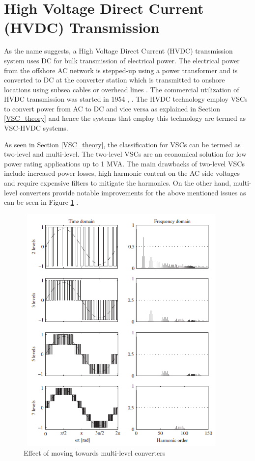 \section{High Voltage Direct Current (HVDC) Transmission}\label{HVDC_trans_theory}
As the name suggests, a High Voltage Direct Current (\gls{HVDC}) transmission system uses \gls{DC} for bulk transmission of electrical power. The electrical power from the offshore \gls{AC} network is stepped-up using a power transformer and is converted to \gls{DC} at the converter station which is transmitted to onshore locations using subsea cables or overhead lines \cite{abbreviewnew}. The commercial utilization of \gls{HVDC} transmission was started in 1954 \cite{cigre2005b4}, \cite{peake_history_2010}. The \gls{HVDC} technology employ \gls{VSC}s to convert power from \gls{AC} to \gls{DC} and vice versa as explained in Section \ref{VSC_theory} and hence the systems that employ this technology are termed as \gls{VSC}-\gls{HVDC} systems.

As seen in Section \ref{VSC_theory}, the classification for \gls{VSC}s can be termed as two-level and multi-level. The two-level \gls{VSC}s are an economical solution for low power rating applications up to 1 MVA. The main drawbacks of two-level \gls{VSC}s include increased power losses, high harmonic content on the \gls{AC} side voltages and require expensive filters to mitigate the harmonics. On the other hand, multi-level converters provide notable improvements for the above mentioned issues as can be seen in Figure \ref{fig:2levelVSCtoMMC} \cite{sharifabadi2016design}.   

\begin{figure}[H]
\centering
    \includegraphics[height = 12.5cm,width = 10.5cm]{Diagrams/Chapter_2/2levelVSCtoMMC.PNG}
    \caption{Effect of moving towards multi-level converters \cite{sharifabadi2016design}}
    \label{fig:2levelVSCtoMMC}
\end{figure}


